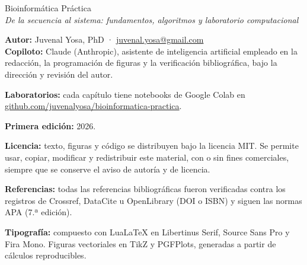\thispagestyle{empty}
\vspace*{\fill}
{\sffamily\small\color{tinta2}\setlength{\parindent}{0pt}\setlength{\parskip}{6pt}
{\titlefont\Large\color{azulnoche} Bioinformática Práctica}\\
{\itshape De la secuencia al sistema: fundamentos, algoritmos y laboratorio computacional}

\medskip
\textbf{Autor:} Juvenal Yosa, PhD · \href{mailto:juvenal.yosa@gmail.com}{juvenal.yosa@gmail.com}\\
\textbf{Copiloto:} Claude (Anthropic), asistente de inteligencia artificial empleado en la
redacción, la programación de figuras y la verificación bibliográfica, bajo la dirección y
revisión del autor.

\textbf{Laboratorios:} cada capítulo tiene notebooks de Google Colab en
\href{https://github.com/juvenalyosa/bioinformatica-practica}{\ttfamily github.com/\allowbreak juvenalyosa/\allowbreak bioinformatica-practica}.

\textbf{Primera edición:} 2026.

\textbf{Licencia:} texto, figuras y código se distribuyen bajo la licencia MIT. Se permite
usar, copiar, modificar y redistribuir este material, con o sin fines comerciales, siempre que se
conserve el aviso de autoría y de licencia.

\textbf{Referencias:} todas las referencias bibliográficas fueron verificadas contra los registros
de Crossref, DataCite u OpenLibrary (DOI o ISBN) y siguen las normas APA (7.ª edición).

\textbf{Tipografía:} compuesto con Lua\LaTeX{} en Libertinus Serif, Source Sans Pro y Fira Mono.
Figuras vectoriales en TikZ y PGFPlots, generadas a partir de cálculos reproducibles.

\medskip
{}
\par}
\cleardoublepage
